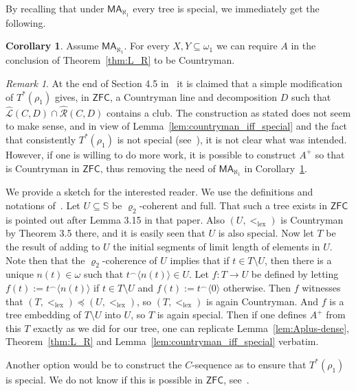 \documentclass[10pt]{amsart}
\theoremstyle{definition}
\newtheorem{corollary}[theorem]{Corollary}
\theoremstyle{remark}
\newtheorem{remark}[theorem]{Remark}
\newcommand{\seb}{\subseteq}
\newcommand{\setm}{\setminus}
\newcommand{\tup}[1]{\langle#1\rangle}
\newcommand{\axiom}[1]{\mathsf{#1}}
\newcommand{\ZFC}{\axiom{ZFC}}
\newcommand{\MA}{\axiom{MA}}
\newcommand{\eleq}{\preceq}
\renewcommand{\L}{\mathscr{L}}
\newcommand{\R}{\mathscr{R}}
\newcommand{\La}{\hat{\L}}
\newcommand{\Ra}{\hat{\R}}
\newcommand\lex{\mathrm{lex}}
\newcommand{\1}{\mathbbm{1}}
\begin{document}
By recalling that under $\MA_{\aleph_{1}}$ every tree is special,
we immediately get the following.

\begin{corollary}\label{cor:MA_L_R}
  Assume $\MA_{\aleph_{1}}$. For every $X,Y \seb \omega_{1}$
  we can require $A$ in the conclusion of Theorem~\ref{thm:L_R} to be Countryman.
\end{corollary}

\begin{remark}\label{rmk:zfc_club_cline}
  At the end of Section 4.5 in~\cite{TodorcevicWalks} it is claimed
  that a simple modification of $T^{*}(\rho_{1})$ gives, in $\ZFC$,
  a Countryman line and decomposition $D$
  such that $\La(C,D) \cap \Ra(C,D)$ contains a club.
  The construction as stated does not seem to make sense, and
  in view of Lemma~\ref{lem:countryman_iff_special} and the fact that
  consistently $T^{*}(\rho_{1})$ is not special (see~\cite[2.2.16]{TodorcevicWalks}),
  it is not clear what was intended. However,
  if one is willing to do more work, it is possible
  to construct $A^{+}$ so that is Countryman in $\ZFC$, thus
  removing the need of $\MA_{\aleph_{1}}$ in Corollary~\ref{cor:MA_L_R}.

  We provide a sketch for the interested reader.
  We use the definitions and notations of~\cite[Section 3]{EisworthEtAl2023}.
  Let $U \seb \mathbb{S}$ be $\varrho_{2}$-coherent and full. That such a tree
  exists in $\ZFC$ is pointed out after Lemma 3.15 in that paper. Also $(U,<_{\lex})$
  is Countryman
  by Theorem 3.5 there, and it is easily seen that $U$ is also special.
  Now let $T$ be the result of adding to $U$ the initial
  segments of limit length of elements in $U$. Note then that the $\varrho_{2}$-coherence
  of $U$ implies that if $t \in T \setm U$, then there is a unique
  $n(t) \in \omega$ such that $t^{\frown}\tup{n(t)} \in U$. Let
  $f : T \to U$ be defined by letting $f(t) := t^{\frown}\tup{n(t)}$ if
  $t \in T \setm U$ and $f(t) := t^{\frown}\tup{0}$ otherwise. Then
  $f$ witnesses that $(T,<_{\lex}) \eleq (U,<_{\lex})$, so $(T,<_{\lex})$
  is again Countryman. And $f$ is a tree embedding of $T \setm U$ into
  $U$, so $T$ is again special. Then if one defines $A^{+}$ from this
  $T$ exactly as we did for our tree, one can replicate
  Lemma~\ref{lem:Aplus-dense}, Theorem~\ref{thm:L_R} and Lemma~\ref{lem:countryman_iff_special}
  verbatim.

  Another option would be to construct the $C$-sequence
  as to ensure that $T^{*}(\rho_{1})$ is special. We do
  not know if this is possible in $\ZFC$,
  see~\cite[Question~2.2.18]{TodorcevicWalks}.
\end{remark}
\end{document}
